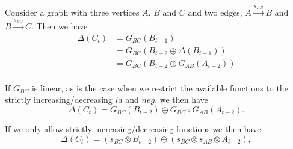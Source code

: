 \documentclass[]{article}
\begin{document}
Consider a graph with three vertices $A$, $B$ and $C$ and two edges,
$A\xrightarrow{s_{AB}} B$ and $B\xrightarrow{s_{BC}} C$. Then we have
\begin{align*}
\Delta(C_t) &= G_{BC}(B_{t-1})\\
&= G_{BC}(B_{t-2} \oplus \Delta(B_{t-1}))\\
&= G_{BC}(B_{t-2}  \oplus G_{AB}(A_{t-2}))\\
\end{align*}

If $G_{BC}$ is linear, as is the case when we restrict the available functions
to the strictly increasing/decreasing $id$ and $neg$,
we then have
\[\Delta(C_t) = G_{BC}(B_{t-2})\oplus G_{BC}\circ G_{AB}(A_{t-2}).\]

If we only allow strictly increasing/decreasing functions we then have
\[\Delta(C_t) = (s_{BC}\otimes B_{t-2})\oplus (s_{BC}\otimes s_{AB}\otimes A_{t-2}),\]
\end{document}
